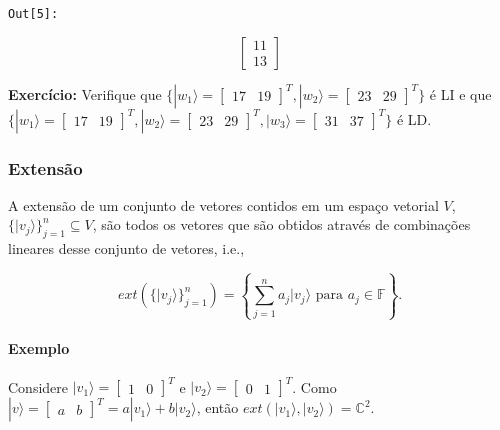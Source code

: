 \documentclass[11pt]{article}
\begin{document}
\texttt{\color{outcolor}Out[{\color{outcolor}5}]:}
    
    $$\left[\begin{matrix}11\\13\end{matrix}\right]$$

    

    \textbf{Exercício:} Verifique que
\(\{|w_{1}\rangle=\begin{bmatrix} 17 & 19 \end{bmatrix}^{T},|w_{2}\rangle=\begin{bmatrix} 23 & 29 \end{bmatrix}^{T}\}\)
é LI e que
\(\{|w_{1}\rangle=\begin{bmatrix} 17 & 19 \end{bmatrix}^{T},|w_{2}\rangle=\begin{bmatrix} 23 & 29 \end{bmatrix}^{T},|w_{3}\rangle=\begin{bmatrix} 31 & 37 \end{bmatrix}^{T}\}\)
é LD.

    \subsubsection{Extensão}\label{extensuxe3o}

A extensão de um conjunto de vetores contidos em um espaço vetorial
\(V\), \(\{|v_{j}\rangle\}_{j=1}^{n}\subseteq V\), são todos os vetores
que são obtidos através de combinações lineares desse conjunto de
vetores, i.e.,

\begin{equation}
ext(\{|v_{j}\rangle\}_{j=1}^{n}) = \left\{\sum_{j=1}^{n}a_{j}|v_{j}\rangle \text{ para } a_{j}\in\mathbb{F}\right\}.
\end{equation}

\paragraph{Exemplo}\label{exemplo}

Considere \(|v_{1}\rangle=\begin{bmatrix} 1 & 0 \end{bmatrix}^{T}\) e
\(|v_{2}\rangle=\begin{bmatrix} 0 & 1 \end{bmatrix}^{T}\). Como
\(|v\rangle=\begin{bmatrix} a & b \end{bmatrix}^{T}=a|v_{1}\rangle+b|v_{2}\rangle\),
então \(ext(|v_{1}\rangle,|v_{2}\rangle)=\mathbb{C}^{2}\).
\end{document}
